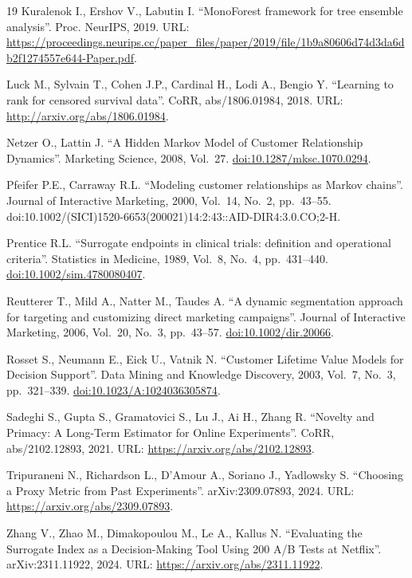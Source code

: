 \begin{thebibliography}{19}
Kuralenok I., Ershov V., Labutin I.
``MonoForest framework for tree ensemble analysis''.
Proc. NeurIPS, 2019.
URL: \url{https://proceedings.neurips.cc/paper_files/paper/2019/file/1b9a80606d74d3da6db2f1274557e644-Paper.pdf}.

Luck M., Sylvain T., Cohen J.P., Cardinal H., Lodi A., Bengio Y.
``Learning to rank for censored survival data''.
CoRR, abs/1806.01984, 2018.
URL: \url{http://arxiv.org/abs/1806.01984}.

Netzer O., Lattin J.
``A Hidden Markov Model of Customer Relationship Dynamics''.
Marketing Science, 2008, Vol.~27.
\href{https://doi.org/10.1287/mksc.1070.0294}{doi:10.1287/mksc.1070.0294}.

Pfeifer P.E., Carraway R.L.
``Modeling customer relationships as Markov chains''.
Journal of Interactive Marketing, 2000, Vol.~14, No.~2, pp.~43--55.
doi:10.1002/(SICI)1520-6653(200021)14:2:43::AID-DIR4:3.0.CO;2-H.

Prentice R.L.
``Surrogate endpoints in clinical trials: definition and operational criteria''.
Statistics in Medicine, 1989, Vol.~8, No.~4, pp.~431--440.
\href{https://doi.org/10.1002/sim.4780080407}{doi:10.1002/sim.4780080407}.

Reutterer T., Mild A., Natter M., Taudes A.
``A dynamic segmentation approach for targeting and customizing direct marketing campaigns''.
Journal of Interactive Marketing, 2006, Vol.~20, No.~3, pp.~43--57.
\href{https://doi.org/10.1002/dir.20066}{doi:10.1002/dir.20066}.

Rosset S., Neumann E., Eick U., Vatnik N.
``Customer Lifetime Value Models for Decision Support''.
Data Mining and Knowledge Discovery, 2003, Vol.~7, No.~3, pp.~321--339.
\href{https://doi.org/10.1023/A:1024036305874}{doi:10.1023/A:1024036305874}.

Sadeghi S., Gupta S., Gramatovici S., Lu J., Ai H., Zhang R.
``Novelty and Primacy: A Long-Term Estimator for Online Experiments''.
CoRR, abs/2102.12893, 2021.
URL: \url{https://arxiv.org/abs/2102.12893}.

Tripuraneni N., Richardson L., D'Amour A., Soriano J., Yadlowsky S.
``Choosing a Proxy Metric from Past Experiments''.
arXiv:2309.07893, 2024.
URL: \url{https://arxiv.org/abs/2309.07893}.

Zhang V., Zhao M., Dimakopoulou M., Le A., Kallus N.
``Evaluating the Surrogate Index as a Decision-Making Tool Using 200 A/B Tests at Netflix''.
arXiv:2311.11922, 2024.
URL: \url{https://arxiv.org/abs/2311.11922}.

\end{thebibliography}